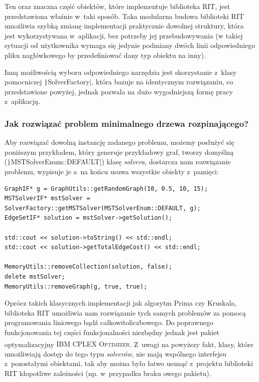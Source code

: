 Ten oraz znaczna część obiektów, które implementuje biblioteka \textsc{RIT}, jest przedstawiona właśnie w~taki sposób.
Taka modularna budowa biblioteki \textsc{RIT} umożliwia szybką zmianę implementacji praktycznie dowolnej struktury, która jest wykorzystywana w~aplikacji, bez potrzeby jej przebudowywania (w takiej sytuacji od użytkownika wymaga się jedynie podmiany dwóch linii odpowiedniego pliku nagłówkowego by przedefiniować dany typ obiektu na inny).

Inną możliwością wyboru odpowiedniego narzędzia jest skorzystanie z~klasy pomocniczej \texttt|SolverFactory|, która bazuje na identycznym rozwiązaniu, co przedstawione powyżej, jednak pozwala na dużo wygodniejszą formę pracy z~aplikacją.


\subsubsection{Jak rozwiązać problem minimalnego drzewa rozpinającego?}


Aby rozwiązać dowolną instancję zadanego problemu, możemy posłużyć się poniższym przykładem, który generuje przykładowy graf, tworzy domyślną (\texttt|MSTSolverEnum::DEFAULT|) klasę \textit{solvera}, dostarcza nam rozwiązanie problemu, wypisuje je a~na końcu usuwa wszystkie obiekty z~pamięci:

\begin{verbatim}
GraphIF* g = GraphUtils::getRandomGraph(10, 0.5, 10, 15);
MSTSolverIF* mstSolver = SolverFactory::getMSTSolver(MSTSolverEnum::DEFAULT, g);
EdgeSetIF* solution = mstSolver->getSolution();

std::cout << solution->toString() << std::endl;
std::cout << solution->getTotalEdgeCost() << std::endl;

MemoryUtils::removeCollection(solution, false);
delete mstSolver;
MemoryUtils::removeGraph(g, true, true);
\end{verbatim}

Oprócz takich klasycznych implementacji jak algorytm Prima czy Kruskala, biblioteka \textsc{RIT} umożliwia nam rozwiązanie tych samych problemów za pomocą programowania liniowego bądź całkowitoliczbowego.
Do poprawnego funkcjonowania tej części funkcjonalności niezbędny jednak jest pakiet optymalizacyjny \textsc{IBM\textsuperscript{\textregistered} CPLEX\textsuperscript{\textregistered} Optimizer}.
Z~uwagi na powyższy fakt, klasy, które umożliwiają dostęp do tego typu \textit{solverów}, nie mają wspólnego interfejsu z~pozostałymi obiektami, tak aby można było łatwo usunąć z~projektu biblioteki \textsc{RIT} kłopotliwe zależności (np. w~przypadku braku owego pakietu).

